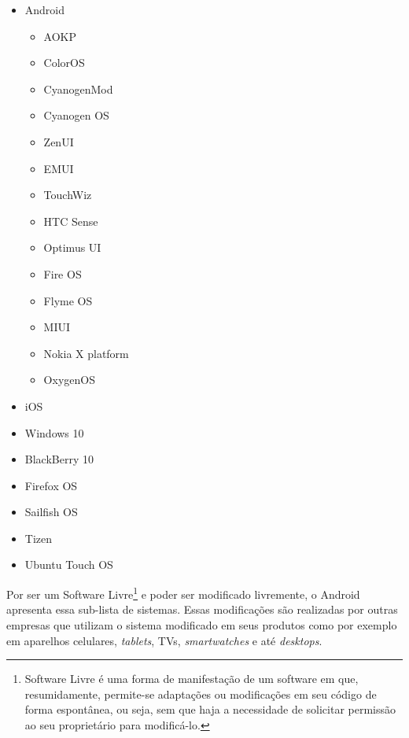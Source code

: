 \begin{itemize}
	\item Android
	\begin{itemize}
		\item AOKP
	    \item ColorOS
	    \item CyanogenMod
	    \item Cyanogen OS
	    \item ZenUI
	    \item EMUI
	    \item TouchWiz
	    \item HTC Sense
	    \item Optimus UI
	    \item Fire OS
	    \item Flyme OS
	    \item MIUI
	    \item Nokia X platform
	    \item OxygenOS
	\end{itemize}
  	\item iOS
	\item Windows 10
	\item BlackBerry 10
	\item Firefox OS
	\item Sailfish OS
	\item Tizen
	\item Ubuntu Touch OS
\end{itemize}

Por ser um Software Livre\footnote{Software Livre é uma forma de manifestação de um software em que, resumidamente, permite-se adaptações ou modificações em seu código de forma espontânea, ou seja, sem que haja a necessidade de solicitar permissão ao seu proprietário para modificá-lo.} e poder ser modificado livremente, o Android apresenta essa sub-lista de sistemas. Essas modificações são realizadas por outras empresas que utilizam o sistema modificado em seus produtos como por exemplo em aparelhos celulares, \textit{tablets}, TVs, \textit{smartwatches} e até \textit{desktops}.